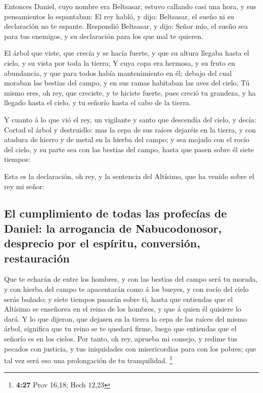  Entonces Daniel, cuyo nombre era Beltsasar, estuvo
callando casi una hora, y sus pensamientos lo espantaban: El rey habló,
y dijo: Beltsasar, el sueño ni su declaración no te espante. Respondió
Beltsasar, y dijo: Señor mío, el sueño sea para tus enemigos, y su
declaración para los que mal te quieren.

 El árbol que viste, que crecía y se hacía fuerte, y que su
altura llegaba hasta el cielo, y su vista por toda la tierra;
 Y cuya copa era hermosa, y su fruto en abundancia, y que
para todos había mantenimiento en él; debajo del cual moraban las
bestias del campo, y en sus ramas habitaban las aves del cielo,
 Tú mismo eres, oh rey, que creciste, y te hiciste fuerte,
pues creció tu grandeza, y ha llegado hasta el cielo, y tu señorío hasta
el cabo de la tierra.

 Y cuanto á lo que vió el rey, un vigilante y santo que
descendía del cielo, y decía: Cortad el árbol y destruidlo: mas la cepa
de sus raíces dejaréis en la tierra, y con atadura de hierro y de metal
en la hierba del campo; y sea mojado con el rocío del cielo, y su parte
sea con las bestias del campo, hasta que pasen sobre él siete tiempos:

 Esta es la declaración, oh rey, y la sentencia del
Altísimo, que ha venido sobre el rey mi señor:

\hypertarget{el-cumplimiento-de-todas-las-profecuxedas-de-daniel-la-arrogancia-de-nabucodonosor-desprecio-por-el-espuxedritu-conversiuxf3n-restauraciuxf3n}{%
\subsection{El cumplimiento de todas las profecías de Daniel: la
arrogancia de Nabucodonosor, desprecio por el espíritu, conversión,
restauración}\label{el-cumplimiento-de-todas-las-profecuxedas-de-daniel-la-arrogancia-de-nabucodonosor-desprecio-por-el-espuxedritu-conversiuxf3n-restauraciuxf3n}}

 Que te echarán de entre los hombres, y con las bestias del
campo será tu morada, y con hierba del campo te apacentarán como á los
bueyes, y con rocío del cielo serás bañado; y siete tiempos pasarán
sobre ti, hasta que entiendas que el Altísimo se enseñorea en el reino
de los hombres, y que á quien él quisiere lo dará.  Y lo
que dijeron, que dejasen en la tierra la cepa de las raíces del mismo
árbol, significa que tu reino se te quedará firme, luego que entiendas
que el señorío es en los cielos.  Por tanto, oh rey,
aprueba mi consejo, y redime tus pecados con justicia, y tus iniquidades
con misericordias para con los pobres; que tal vez será eso una
prolongación de tu tranquilidad. \footnote{\textbf{4:27} Prov 16,18;
  Hech 12,23}

